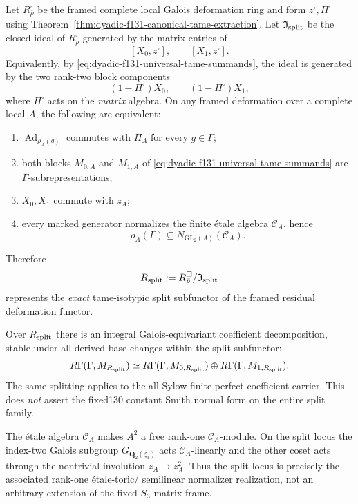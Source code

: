 \begin{theorem}
\label{thm:dyadic-f131-universal-split-locus}
Let $R_{\bar\rho}^{\square}$ be
the framed complete local
Galois deformation ring
and form $z^\square,\Pi^\square$
using Theorem~\ref{thm:dyadic-f131-canonical-tame-extraction}.
Let $\mathfrak I_{\rm split}$
be the closed ideal of
$R_{\bar\rho}^{\square}$
generated by the matrix entries of
\begin{equation}\label{eq:dyadic-f131-wild-split-equations}
\boxed{\qquad
[X_0,z^\square],\qquad
[X_1,z^\square].
\qquad}
\end{equation}
Equivalently, by
\eqref{eq:dyadic-f131-universal-tame-summands},
the ideal is generated by
the two rank-two block
components
\begin{equation}\label{eq:dyadic-f131-wild-split-projector-equations}
\boxed{\qquad
(1-\Pi^\square)X_0,\qquad
(1-\Pi^\square)X_1,
\qquad}
\end{equation}
where $\Pi^\square$ acts
on the \emph{matrix} algebra.
On any framed deformation
over a complete local $A$,
the following are equivalent:
\begin{enumerate}[label=\textnormal{(\roman*)}]
\item $\operatorname{Ad}_{\rho_A(g)}$
commutes with $\Pi_A$
for every $g\in\Gamma$;
\item both blocks $M_{0,A}$ and
$M_{1,A}$ of
\eqref{eq:dyadic-f131-universal-tame-summands}
are $\Gamma$-subrepresentations;
\item $X_0,X_1$ commute with $z_A$;
\item every marked generator
normalizes the finite étale
algebra $\mathcal C_A$,
hence
\[
\rho_A(\Gamma)\subseteq
N_{\mathrm{GL}_2(A)}(\mathcal C_A).
\]
\end{enumerate}
Therefore
\begin{equation}\label{eq:dyadic-f131-split-ring}
R_{\rm split}:=
R_{\bar\rho}^{\square}/\mathfrak I_{\rm split}
\end{equation}
represents the \emph{exact}
tame-isotypic split
subfunctor of the framed
residual deformation functor.

Over $R_{\rm split}$ there
is an integral Galois-equivariant
coefficient decomposition,
stable under all derived
base changes within the
split subfunctor:
\begin{equation}\label{eq:dyadic-f131-split-cochains}
R\Gamma(\Gamma,M_{R_{\rm split}})
\simeq
R\Gamma(\Gamma,M_{0,R_{\rm split}})
\oplus
R\Gamma(\Gamma,M_{1,R_{\rm split}}).
\end{equation}
The same splitting applies
to the all-Sylow finite
perfect coefficient carrier.
This does \emph{not} assert
the fixed130 constant Smith
normal form on the entire
split family.

The étale algebra
$\mathcal C_A$ makes $A^2$
a free rank-one
$\mathcal C_A$-module.
On the split locus the
index-two Galois subgroup
$G_{\mathbf Q_2(\zeta_3)}$
acts $\mathcal C_A$-linearly
and the other coset
acts through the
nontrivial involution
$z_A\mapsto z_A^2$.
Thus the split locus is
precisely the associated
rank-one étale-toric/
semilinear normalizer
realization, not an
arbitrary extension of
the fixed $S_3$ matrix frame.
\end{theorem}

